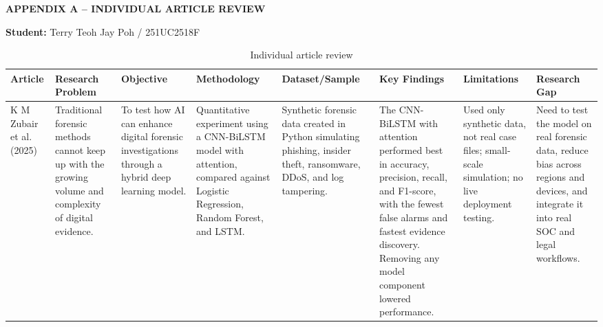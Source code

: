 \documentclass[12pt,a4paper]{article}
\begin{document}
\newpage
\begin{landscape}
\begin{flushleft}
    {\fontsize{14pt}{17pt}\selectfont
    \textbf{APPENDIX A -- INDIVIDUAL ARTICLE REVIEW}}
\end{flushleft}

\vspace{0.3cm}

\textbf{Student:} Terry Teoh Jay Poh / 251UC2518F
\begin{table}[H]
\caption{Individual article review}
\label{tab:individual-article-review}
\vspace{-0.2cm}
\fontsize{7.5pt}{9.5pt}\selectfont
\renewcommand{\arraystretch}{1.1}

\begin{tabularx}{\linewidth}{|>{\raggedright\arraybackslash}p{2.2cm}|>{\raggedright\arraybackslash}X|>{\raggedright\arraybackslash}X|>{\raggedright\arraybackslash}X|>{\raggedright\arraybackslash}X|>{\raggedright\arraybackslash}X|>{\raggedright\arraybackslash}X|>{\raggedright\arraybackslash}X|}
\hline

\textbf{Article} &
\textbf{Research Problem} &
\textbf{Objective} &
\textbf{Methodology} &
\textbf{Dataset/Sample} &
\textbf{Key Findings} &
\textbf{Limitations} &
\textbf{Research Gap}
\tabularnewline
\hline

K M Zubair et al. (2025) & 
Traditional forensic methods cannot keep up with the growing volume and complexity of digital evidence. & 
To test how AI can enhance digital forensic investigations through a hybrid deep learning model. & 
Quantitative experiment using a CNN-BiLSTM model with attention, compared against Logistic Regression, Random Forest, and LSTM. & 
Synthetic forensic data created in Python simulating phishing, insider theft, ransomware, DDoS, and log tampering. & 
The CNN-BiLSTM with attention performed best in accuracy, precision, recall, and F1-score, with the fewest false alarms and fastest evidence discovery. Removing any model component lowered performance. & 
Used only synthetic data, not real case files; small-scale simulation; no live deployment testing. & 
Need to test the model on real forensic data, reduce bias across regions and devices, and integrate it into real SOC and legal workflows.
\tabularnewline
\hline


\end{tabularx}
\end{table}
\end{landscape}
\end{document}
